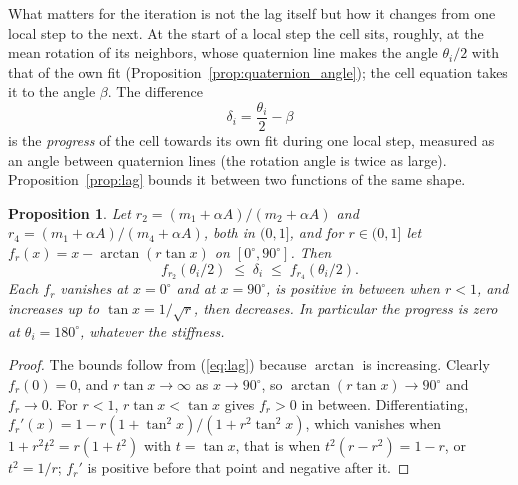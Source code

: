 \documentclass{birkjour}
\newtheorem{prop}[thm]{Proposition}
\theoremstyle{remark}
\numberwithin{equation}{section}
\begin{document}
What matters for the iteration is not the lag itself but how it changes from one local step to the next. At the start of a local step the cell sits, roughly, at the mean rotation of its neighbors, whose quaternion line makes the angle $\theta_i / 2$ with that of the own fit (Proposition~\ref{prop:quaternion_angle}); the cell equation takes it to the angle $\beta$. The difference
\begin{equation}
\label{eq:progress}
\delta_i = \frac{\theta_i}{2} - \beta
\end{equation}
is the \emph{progress} of the cell towards its own fit during one local step, measured as an angle between quaternion lines (the rotation angle is twice as large). Proposition~\ref{prop:lag} bounds it between two functions of the same shape.
\begin{prop}
\label{prop:progress}
Let $r_2 = (m_1 + \alpha A)/(m_2 + \alpha A)$ and $r_4 = (m_1 + \alpha A)/(m_4 + \alpha A)$, both in $(0, 1]$, and for $r \in (0, 1]$ let $f_r(x) = x - \arctan(r \tan x)$ on $[0^\circ, 90^\circ]$. Then
\begin{equation*}
f_{r_2}(\theta_i / 2) \;\leq\; \delta_i \;\leq\; f_{r_4}(\theta_i / 2).
\end{equation*}
Each $f_r$ vanishes at $x = 0^\circ$ and at $x = 90^\circ$, is positive in between when $r < 1$, and increases up to $\tan x = 1 / \sqrt r$, then decreases. In particular the progress is zero at $\theta_i = 180^\circ$, whatever the stiffness.
\end{prop}
\begin{proof}
The bounds follow from (\ref{eq:lag}) because $\arctan$ is increasing. Clearly $f_r(0) = 0$, and $r \tan x \to \infty$ as $x \to 90^\circ$, so $\arctan(r \tan x) \to 90^\circ$ and $f_r \to 0$. For $r < 1$, $r \tan x < \tan x$ gives $f_r > 0$ in between. Differentiating, $f_r'(x) = 1 - r (1 + \tan^2 x) / (1 + r^2 \tan^2 x)$, which vanishes when $1 + r^2 t^2 = r (1 + t^2)$ with $t = \tan x$, that is when $t^2 (r - r^2) = 1 - r$, or $t^2 = 1/r$; $f_r'$ is positive before that point and negative after it.
\end{proof}
\end{document}

